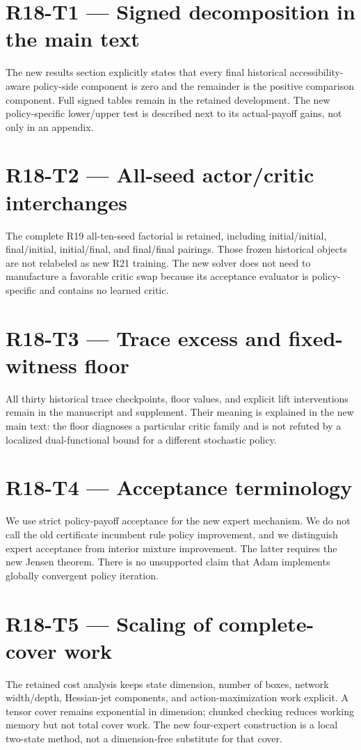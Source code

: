 \documentclass[ecta]{econsocart}
\theoremstyle{remark}
\begin{document}
\section{R18-T1 — Signed decomposition in the main text}
The new results section explicitly states that every final historical accessibility-aware policy-side component is zero and the remainder is the positive comparison component. Full signed tables remain in the retained development. The new policy-specific lower/upper test is described next to its actual-payoff gains, not only in an appendix.

\section{R18-T2 — All-seed actor/critic interchanges}
The complete R19 all-ten-seed factorial is retained, including initial/initial, final/initial, initial/final, and final/final pairings. Those frozen historical objects are not relabeled as new R21 training. The new solver does not need to manufacture a favorable critic swap because its acceptance evaluator is policy-specific and contains no learned critic.

\section{R18-T3 — Trace excess and fixed-witness floor}
All thirty historical trace checkpoints, floor values, and explicit lift interventions remain in the manuscript and supplement. Their meaning is explained in the new main text: the floor diagnoses a particular critic family and is not refuted by a localized dual-functional bound for a different stochastic policy.

\section{R18-T4 — Acceptance terminology}
We use strict policy-payoff acceptance for the new expert mechanism. We do not call the old certificate incumbent rule policy improvement, and we distinguish expert acceptance from interior mixture improvement. The latter requires the new Jensen theorem. There is no unsupported claim that Adam implements globally convergent policy iteration.

\section{R18-T5 — Scaling of complete-cover work}
The retained cost analysis keeps state dimension, number of boxes, network width/depth, Hessian-jet components, and action-maximization work explicit. A tensor cover remains exponential in dimension; chunked checking reduces working memory but not total cover work. The new four-expert construction is a local two-state method, not a dimension-free substitute for that cover.
\end{document}
